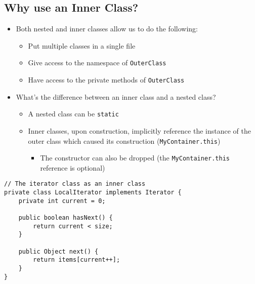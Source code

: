 \documentclass[10pt]{article}
\begin{document}
\subsection*{Why use an Inner Class?}
\begin{itemize}
    \item Both nested and inner classes allow us to do the following:
    \begin{itemize}
        \item Put multiple classes in a single file
        \item Give access to the namespace of \texttt{OuterClass}
        \item Have access to the private methods of \texttt{OuterClass}
    \end{itemize}
    \item What's the difference between an inner class and a nested class?
    \begin{itemize}
        \item A nested class can be \texttt{static}
        \item Inner classes, upon construction, implicitly reference the instance of the outer class which caused its construction (\texttt{MyContainer.this})
        \begin{itemize}
            \item The constructor can also be dropped (the \texttt{MyContainer.this} reference is optional)
        \end{itemize}
    \end{itemize}
\end{itemize}
\begin{verbatim}
// The iterator class as an inner class
private class LocalIterator implements Iterator {
    private int current = 0;
    
    public boolean hasNext() {
        return current < size;
    }
    
    public Object next() {
        return items[current++];
    }
}
\end{verbatim}
\end{document}
